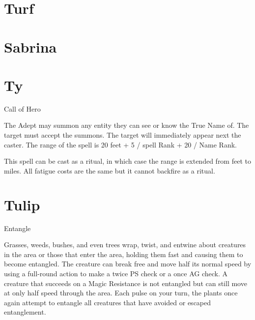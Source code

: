 \documentclass[a4paper]{article}
\begin{document}
\begin{multicols*}{3}

\section{Turf}

\section{Sabrina}

\section{Ty}

\begin{spell}{Call of Hero}
\begin{effects}
The Adept may summon any entity they can see or know the True Name of.
The target must accept the summons.  The target will immediately
appear next the caster.  The range of the spell is 20 feet + 5 / spell
Rank + 20 / Name Rank.

This spell can be cast as a ritual, in which case the range is
extended from feet to miles.  All fatigue costs are the same but it
cannot backfire as a ritual.
\end{effects}
\end{spell}

\section{Tulip}

\begin{spell}[S-1]{Entangle}
\begin{effects}
Grasses, weeds, bushes, and even trees wrap, twist, and entwine about
creatures in the area or those that enter the area, holding them fast
and causing them to become entangled. The creature can break free and
move half its normal speed by using a full-round action to make a
twice PS check or a once AG check. A creature that succeeds on a Magic
Resistance is not entangled but can still move at only half speed
through the area.  Each pulse on your turn, the plants once again
attempt to entangle all creatures that have avoided or escaped
entanglement.
\end{effects}
\end{spell}

\end{multicols*}
\end{document}
